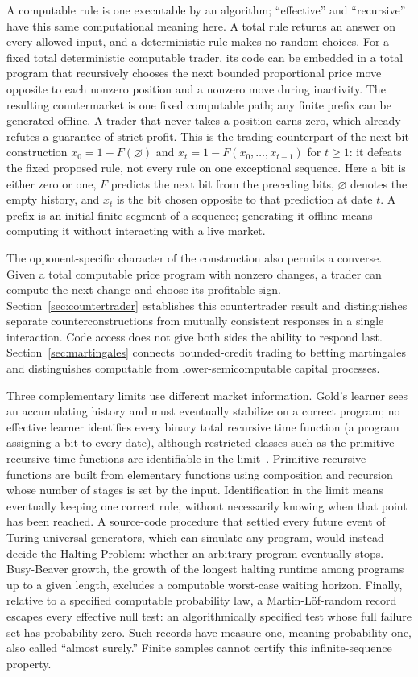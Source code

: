 \documentclass[aps,pra,reprint,superscriptaddress,amsmath,amssymb,floatfix]{revtex4-2}
\theoremstyle{plain}
\theoremstyle{definition}
\theoremstyle{remark}
\begin{document}
A computable rule is one executable by an algorithm; ``effective'' and
``recursive'' have this same computational meaning here. A total rule returns
an answer on every allowed input, and a deterministic rule makes no random
choices. For a fixed total deterministic computable trader, its code can be
embedded in a total program that recursively chooses the next bounded proportional price
move opposite to each nonzero position and a nonzero move during inactivity.
The resulting countermarket is one
fixed computable path; any finite prefix can be generated offline. A trader that
never takes a position earns zero, which already refutes a guarantee of strict
profit. This is the trading counterpart of the next-bit construction
\(x_0=1-F(\varnothing)\) and
\(x_t=1-F(x_0,\ldots,x_{t-1})\) for \(t\geq1\): it defeats the fixed proposed
rule, not every rule on one exceptional sequence. Here a bit is either zero
or one, \(F\) predicts the next bit from the preceding bits,
\(\varnothing\) denotes the empty history, and \(x_t\) is the bit chosen
opposite to that prediction at date \(t\). A prefix is an initial finite
segment of a sequence; generating it offline means computing it without
interacting with a live market.

The opponent-specific character of the construction also permits a converse.
Given a total computable price program with nonzero changes, a trader can
compute the next change and choose its profitable sign.
Section~\ref{sec:countertrader} establishes this countertrader result and
distinguishes separate counterconstructions from mutually consistent
responses in a single interaction. Code access does not give both sides
the ability to respond last. Section~\ref{sec:martingales} connects
bounded-credit trading to betting martingales and distinguishes
computable from lower-semicomputable capital processes.

Three complementary limits use different market information. Gold's learner
sees an accumulating history and must eventually stabilize on a correct
program; no effective learner identifies every binary total recursive time
function (a program assigning a bit to every date), although restricted
classes such as the primitive-recursive time functions are identifiable in
the limit~\cite{go-65,go-67}. Primitive-recursive functions are built from
elementary functions using composition and recursion whose number of stages is set by the input. Identification in the limit means eventually keeping
one correct rule, without necessarily knowing when that point has been reached.
A source-code procedure that settled every future event of Turing-universal
generators, which can simulate any program, would instead decide the Halting
Problem: whether an arbitrary program eventually stops. Busy-Beaver growth,
the growth of the longest halting runtime among programs up to a given length,
excludes a computable worst-case waiting horizon. Finally, relative to a
specified computable probability law, a Martin-L\"of-random record escapes
every effective null test: an algorithmically specified test whose full
failure set has probability zero. Such records have measure one, meaning
probability one, also called ``almost surely.'' Finite samples cannot certify
this infinite-sequence property.
\end{document}
